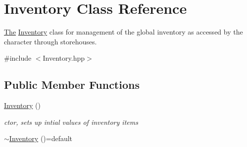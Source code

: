 \hypertarget{class_inventory}{}\section{Inventory Class Reference}
\label{class_inventory}


\hyperlink{namespace_the}{The} \hyperlink{class_inventory}{Inventory} class for management of the global inventory as accessed by the character through storehouses.  




{\ttfamily \#include $<$Inventory.\+hpp$>$}

\subsection*{Public Member Functions}
\begin{DoxyCompactItemize}
\item 
\hypertarget{class_inventory_a10485613fc8bfb32ee564d9b5110f8fb}{}\hyperlink{class_inventory_a10485613fc8bfb32ee564d9b5110f8fb}{Inventory} ()\label{class_inventory_a10485613fc8bfb32ee564d9b5110f8fb}

\begin{DoxyCompactList}\small\item\em ctor, sets up intial values of inventory items \end{DoxyCompactList}\item 
\hypertarget{class_inventory_a6a62abfbed83022510a4e5ba64543288}{}\hyperlink{class_inventory_a6a62abfbed83022510a4e5ba64543288}{$\sim$\+Inventory} ()=default\label{class_inventory_a6a62abfbed83022510a4e5ba64543288}


\end{DoxyCompactItemize}
